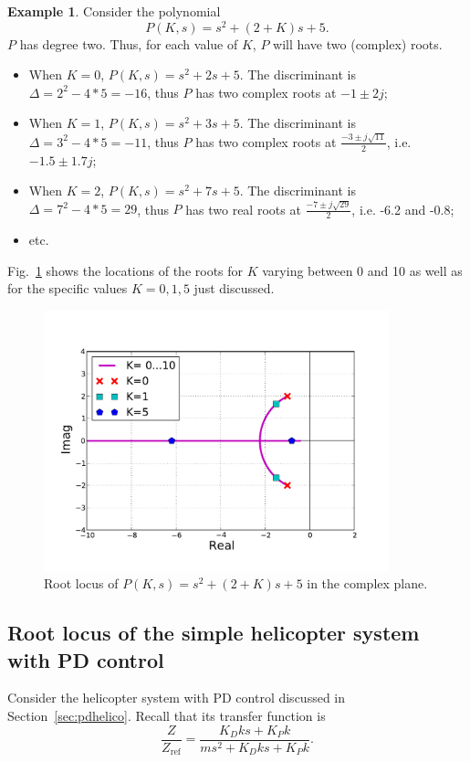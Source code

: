 \documentclass[a4paper,11pt]{report}
\theoremstyle{definition}
\newcommand{\re}{\mathrm{ref}}
\newtheorem{mdexample}{Example}
\newenvironment{example}%
  {\vspace{0.1cm}\begin{mdframed}[backgroundcolor=lightgray]\begin{mdexample}}%
  {\end{mdexample}\end{mdframed}\vspace{0.1cm}}
\begin{document}
\begin{example}
  Consider the polynomial
  \[
  P(K,s) = s^2 + (2+K)s + 5.
  \]
  $P$ has degree two. Thus, for each value of $K$, $P$ will have two
  (complex) roots.
  \begin{itemize}
  \item When $K=0$, $P(K,s) = s^2 + 2s + 5$. The discriminant is
    $\Delta=2^2-4*5=-16$, thus $P$ has two complex roots at $-1\pm
    2j$;
  \item When $K=1$, $P(K,s) = s^2 + 3s + 5$. The discriminant is
    $\Delta=3^2-4*5=-11$, thus $P$ has two complex roots at
    $\frac{-3\pm j\sqrt{11}}{2}$, i.e. $-1.5\pm1.7j$;
  \item When $K=2$, $P(K,s) = s^2 + 7s + 5$. The discriminant is
    $\Delta=7^2-4*5=29$, thus $P$ has two real roots at $\frac{-7\pm
      j\sqrt{29}}{2}$, i.e. -6.2 and -0.8;
  \item etc.
  \end{itemize}
  Fig.~\ref{fig:rlocusex} shows the locations of the roots for $K$
  varying between 0 and 10 as well as for the specific values
  $K=0,1,5$ just discussed.
  \begin{figure}[H]
    \centering
    \includegraphics[width=10cm]{fig/rlocusex.pdf}
    \caption{Root locus of $P(K,s) = s^2 + (2+K)s + 5$ in the complex plane.}
    \label{fig:rlocusex}
  \end{figure}
\end{example}


\subsection{Root locus of the simple helicopter system with PD control}
\label{sec:helicopd}

Consider the helicopter system with PD control discussed in
Section~\ref{sec:pdhelico}. Recall that its transfer function is
\[
\frac{Z}{Z_\re} = \frac{K_Dk s+ K_Pk}{ms^2+K_Dks+K_Pk}.
\]
\end{document}

